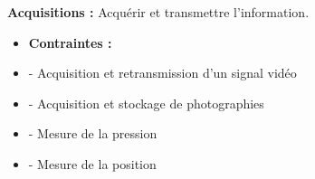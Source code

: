 \documentclass[a4paper,11pt]{report}
\begin{document}
\textbf{\LARGE Acquisitions :\newline \newline}
Acquérir et transmettre l'information. \newline
\begin{itemize}
	\item \textbf{Contraintes :}
	\item - Acquisition et retransmission d'un signal vidéo
	\item - Acquisition et stockage de photographies
	\item - Mesure de la pression
	\item - Mesure de la position
\end{itemize}
\end{document}
